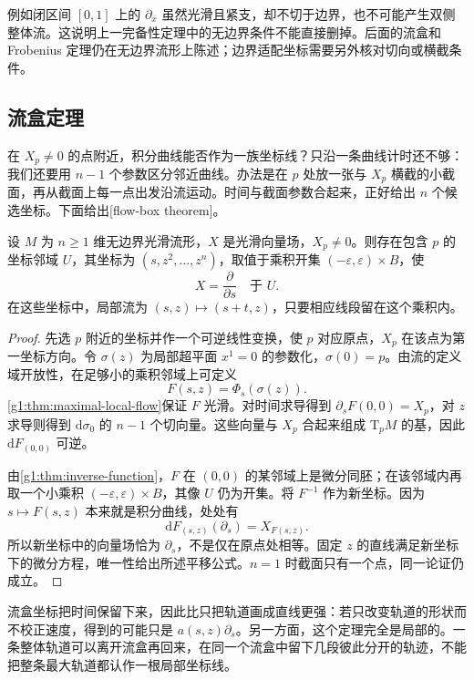例如闭区间 \([0,1]\) 上的 \(\partial_x\) 虽然光滑且紧支，却不切于边界，也不可能产生双侧整体流。这说明上一完备性定理中的无边界条件不能直接删掉。后面的流盒和 Frobenius 定理仍在无边界流形上陈述；边界适配坐标需要另外核对切向或横截条件。

\subsection{流盒定理}
\label{g1:subsec:1302:03}

在 \(X_p\neq0\) 的点附近，积分曲线能否作为一族坐标线？只沿一条曲线计时还不够：我们还要用 \(n-1\) 个参数区分邻近曲线。办法是在 \(p\) 处放一张与 \(X_p\) 横截的小截面，再从截面上每一点出发沿流运动。时间与截面参数合起来，正好给出 \(n\) 个候选坐标。下面给出[flow-box theorem]。

\begin{theorem}
	\label{g1:thm:flow-box}
	设 \(M\) 为 \(n\geq1\) 维无边界光滑流形，\(X\) 是光滑向量场，\(X_p\neq0\)。则存在包含 \(p\) 的坐标邻域 \(U\)，其坐标为 \((s,z^2,\ldots,z^n)\)，取值于乘积开集 \((-\varepsilon,\varepsilon)\times B\)，使
	\[
		X=\frac{\partial}{\partial s}\quad\text{于 }U.
	\]
	在这些坐标中，局部流为 \((s,z)\mapsto(s+t,z)\)，只要相应线段留在这个乘积内。
\end{theorem}
\begin{proof}
	先选 \(p\) 附近的坐标并作一个可逆线性变换，使 \(p\) 对应原点，\(X_p\) 在该点为第一坐标方向。令 \(\sigma(z)\) 为局部超平面 \(x^1=0\) 的参数化，\(\sigma(0)=p\)。由流的定义域开放性，在足够小的乘积邻域上可定义
	\[
		F(s,z)=\Phi_s(\sigma(z)).
	\]
	\cref{g1:thm:maximal-local-flow}保证 \(F\) 光滑。对时间求导得到 \(\partial_sF(0,0)=X_p\)，对 \(z\) 求导则得到 \(\mathrm{d}\sigma_0\) 的 \(n-1\) 个切向量。这些向量与 \(X_p\) 合起来组成 \(\mathrm{T}_pM\) 的基，因此 \(\mathrm{d}F_{(0,0)}\) 可逆。

	由\cref{g1:thm:inverse-function}，\(F\) 在 \((0,0)\) 的某邻域上是微分同胚；在该邻域内再取一个小乘积 \((-\varepsilon,\varepsilon)\times B\)，其像 \(U\) 仍为开集。将 \(F^{-1}\) 作为新坐标。因为 \(s\mapsto F(s,z)\) 本来就是积分曲线，处处有
	\[
		\mathrm{d}F_{(s,z)}(\partial_s)=X_{F(s,z)}.
	\]
	所以新坐标中的向量场恰为 \(\partial_s\)，不是仅在原点处相等。固定 \(z\) 的直线满足新坐标下的微分方程，唯一性给出所述平移公式。\(n=1\) 时截面只有一个点，同一论证仍成立。
\end{proof}



流盒坐标把时间保留下来，因此比只把轨道画成直线更强：若只改变轨道的形状而不校正速度，得到的可能只是 \(a(s,z)\partial_s\)。另一方面，这个定理完全是局部的。一条整体轨道可以离开流盒再回来，在同一个流盒中留下几段彼此分开的轨迹，不能把整条最大轨道都认作一根局部坐标线。

